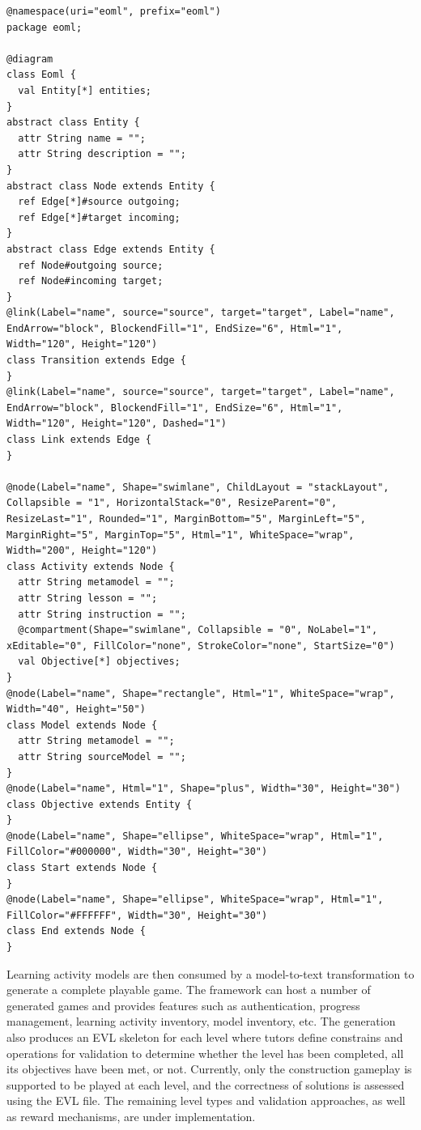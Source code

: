 \documentclass[conference]{IEEEtran}
\begin{document}
\begin{lstlisting}[style=interfaces,caption={The annotated metamodel of learning activity modelling language.}, label=pattern-metamodel]
@namespace(uri="eoml", prefix="eoml")
package eoml;

@diagram
class Eoml {
  val Entity[*] entities;
}
abstract class Entity {
  attr String name = "";
  attr String description = "";
}
abstract class Node extends Entity {
  ref Edge[*]#source outgoing;
  ref Edge[*]#target incoming;
}
abstract class Edge extends Entity {
  ref Node#outgoing source;
  ref Node#incoming target;
}
@link(Label="name", source="source", target="target", Label="name", EndArrow="block", BlockendFill="1", EndSize="6", Html="1", Width="120", Height="120")
class Transition extends Edge {
}
@link(Label="name", source="source", target="target", Label="name", EndArrow="block", BlockendFill="1", EndSize="6", Html="1", Width="120", Height="120", Dashed="1")
class Link extends Edge {
}

@node(Label="name", Shape="swimlane", ChildLayout = "stackLayout", Collapsible = "1", HorizontalStack="0", ResizeParent="0", ResizeLast="1", Rounded="1", MarginBottom="5", MarginLeft="5", MarginRight="5", MarginTop="5", Html="1", WhiteSpace="wrap", Width="200", Height="120")
class Activity extends Node {
  attr String metamodel = "";
  attr String lesson = "";
  attr String instruction = "";
  @compartment(Shape="swimlane", Collapsible = "0", NoLabel="1", xEditable="0", FillColor="none", StrokeColor="none", StartSize="0")
  val Objective[*] objectives;
}
@node(Label="name", Shape="rectangle", Html="1", WhiteSpace="wrap", Width="40", Height="50")
class Model extends Node {
  attr String metamodel = "";
  attr String sourceModel = "";
}
@node(Label="name", Html="1", Shape="plus", Width="30", Height="30")
class Objective extends Entity {
}
@node(Label="name", Shape="ellipse", WhiteSpace="wrap", Html="1", FillColor="#000000", Width="30", Height="30")
class Start extends Node {
}
@node(Label="name", Shape="ellipse", WhiteSpace="wrap", Html="1", FillColor="#FFFFFF", Width="30", Height="30")
class End extends Node {
}
\end{lstlisting} 

Learning activity models are then consumed by a model-to-text transformation to generate a complete playable game. The framework can host a number of generated games and provides features such as authentication, progress management, learning activity inventory, model inventory, etc. The generation also produces an EVL \cite{kolovos2006eclipse} skeleton for each level where tutors define constrains and operations for validation to determine whether the level has been completed, all its objectives have been met, or not. Currently, only the construction gameplay is supported to be played at each level, and the correctness of solutions is assessed using the EVL file. The remaining level types and validation approaches, as well as reward mechanisms,  are under implementation. 
\end{document}
